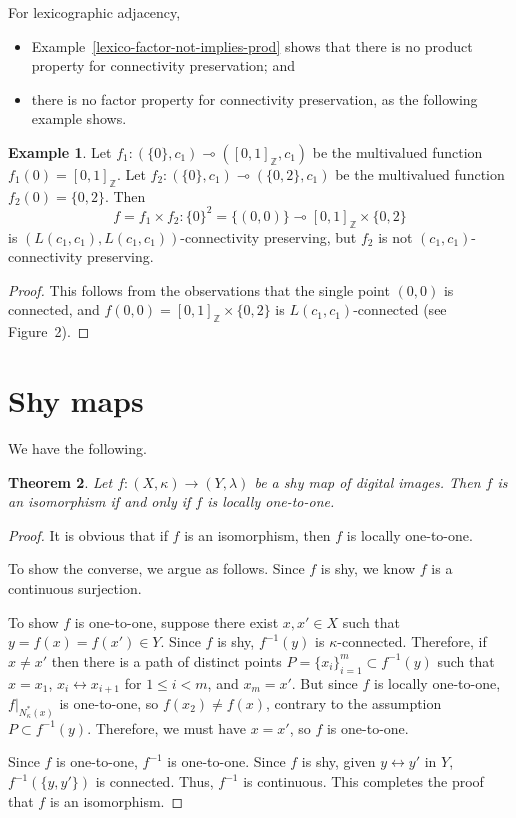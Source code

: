 \documentclass{article}
\theoremstyle{plain}
\newtheorem{thm}{Theorem}
\theoremstyle{definition}
\newtheorem{exl}[thm]{Example}
\numberwithin{thm}{section}
\newcommand{\adj}{\leftrightarrow}
\def\Z{{\mathbb Z}}
\begin{document}
For lexicographic adjacency,
\begin{itemize}
\item Example~\ref{lexico-factor-not-implies-prod}
shows that there is no product property for
connectivity preservation; and
\item there is no factor property for connectivity preservation, as
      the following example shows.
\end{itemize}

\begin{exl}
Let $f_1:(\{0\},c_1) \multimap ([0,1]_{\Z},c_1)$ be the multivalued function
$f_1(0)=[0,1]_{\Z}$. Let
$f_2:(\{0\},c_1) \multimap (\{0,2\},c_1)$ be the multivalued function $f_2(0)=\{0,2\}$. Then
\[ f=f_1 \times f_2: \{0\}^2=\{(0,0)\} \multimap [0,1]_{\Z} \times \{0,2\} \]
is 
$(L(c_1,c_1),L(c_1,c_1))$-connectivity preserving, but $f_2$ is not
$(c_1,c_1)$-connectivity preserving.
\end{exl}

\begin{proof}
This follows from the observations that the single 
point $(0,0)$ is connected, and
$f(0,0)=[0,1]_{\Z} \times \{0,2\}$ is $L(c_1,c_1)$-connected (see Figure~2).
\end{proof}

\section{Shy maps}
We have the following.

\begin{thm}
Let $f: (X,\kappa) \to (Y,\lambda)$
be a shy map of digital images.
Then $f$ is an isomorphism if
and only if $f$ is locally one-to-one.
\end{thm}

\begin{proof}
It is obvious that if $f$ is an
isomorphism, then $f$ is locally one-to-one.

To show the converse, we argue as
follows. Since $f$ is shy, we know
$f$ is a continuous surjection.

To show $f$ is one-to-one, suppose
there exist $x,x' \in X$ such that $y=f(x)=f(x') \in Y$. Since $f$
is shy, $f^{-1}(y)$ is $\kappa$-connected. Therefore,
if $x \neq x'$ then there is a
path of distinct points
$P=\{x_i\}_{i=1}^m \subset f^{-1}(y)$
such that $x=x_1$, $x_i \adj x_{i+1}$ for $1 \le i < m$, and
$x_m=x'$. But since $f$ is locally
one-to-one, $f|_{N_{\kappa}^*(x)}$ is one-to-one, so $f(x_2) \neq f(x)$,
contrary to the assumption $P \subset f^{-1}(y)$. Therefore, we must have
$x=x'$, so $f$ is one-to-one.

Since $f$ is one-to-one, $f^{-1}$ is one-to-one. Since $f$ is shy,
given $y \adj y'$ in $Y$,
$f^{-1}(\{y,y'\})$ is connected.
Thus, $f^{-1}$ is continuous. This
completes the proof that $f$ is an
isomorphism.
\end{proof}
\end{document}
